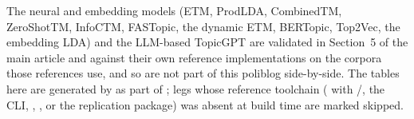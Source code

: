 \documentclass[article,nojss]{jss}
\begin{document}
The neural and embedding models (ETM, ProdLDA, CombinedTM, ZeroShotTM, InfoCTM,
FASTopic, the dynamic ETM, BERTopic, Top2Vec, the embedding LDA) and the LLM-based
TopicGPT are validated in Section~5 of the main article and  against
their own reference implementations on the corpora those references use, and so are
not part of this poliblog side-by-side. The tables here are generated by
 as part of ; legs whose
reference toolchain ( with /, the 
CLI, , , or the  replication package) was
absent at build time are marked skipped.


\end{document}
